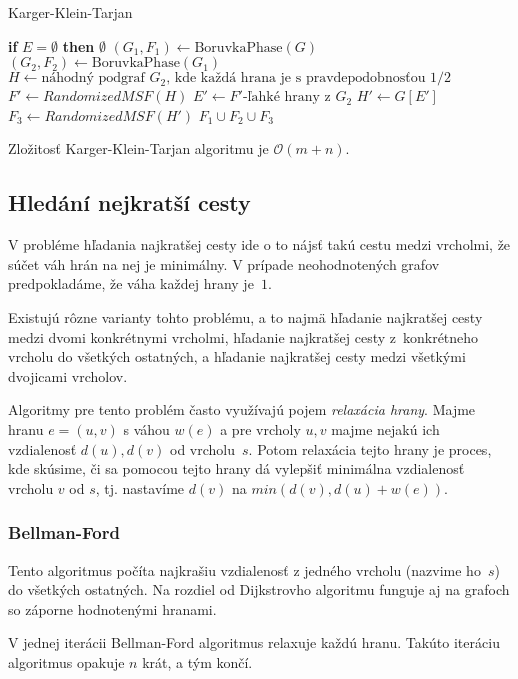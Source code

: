 \begin{algorithm}
\caption{Karger-Klein-Tarjan}
\begin{algorithmic}[1]
    \State \textbf{if} {$E = \emptyset$} \textbf{then} \Return $\emptyset$
    \State $(G_1, F_1) \gets \text{BoruvkaPhase}(G)$
	\State $(G_2, F_2) \gets \text{BoruvkaPhase}(G_1)$
	\State $H \gets \text{náhodný podgraf }G_2\text{, kde každá hrana je s pravdepodobnosťou }1/2$
	\State $F' \gets RandomizedMSF(H)$
	\State $E' \gets F'\text{-ľahké hrany z }G_2$
	\State $H' \gets G[E']$
	\State $F_3 \gets RandomizedMSF(H')$
    \State \Return $F_1 \cup F_2 \cup F_3$
\EndFunction
\end{algorithmic}
\end{algorithm}

Zložitosť Karger-Klein-Tarjan algoritmu je $\mathcal{O}(m+n)$.

\subsection{Hledání nejkratší cesty}

V probléme hľadania najkratšej cesty ide o to nájsť takú cestu
medzi vrcholmi, že súčet váh hrán na nej je minimálny. V prípade
neohodnotených grafov predpokladáme, že váha každej hrany je~$1$.

Existujú rôzne varianty tohto problému, a to najmä hľadanie najkratšej
cesty medzi dvomi konkrétnymi vrcholmi, hľadanie najkratšej cesty
z~konkrétneho vrcholu do všetkých ostatných, a hľadanie najkratšej
cesty medzi všetkými dvojicami vrcholov.

Algoritmy pre tento problém často využívajú pojem {\em relaxácia hrany}.
Majme hranu $e=(u,v)$ s váhou $w(e)$ a pre vrcholy $u,v$ majme nejakú
ich vzdialenosť $d(u), d(v)$ od vrcholu~$s$. Potom relaxácia tejto
hrany je proces, kde skúsime, či sa pomocou tejto hrany dá
vylepšiť minimálna vzdialenosť vrcholu $v$ od $s$, tj. nastavíme
$d(v)$ na $min(d(v),d(u)+w(e))$.

\subsubsection*{Bellman-Ford}
Tento algoritmus počíta najkrašiu vzdialenosť z jedného vrcholu
(nazvime ho~$s$) do všetkých ostatných. Na rozdiel od Dijkstrovho
algoritmu funguje aj na grafoch so záporne hodnotenými hranami.

V jednej iterácii Bellman-Ford algoritmus relaxuje každú hranu.
Takúto iteráciu algoritmus opakuje $n$ krát, a tým končí. 

